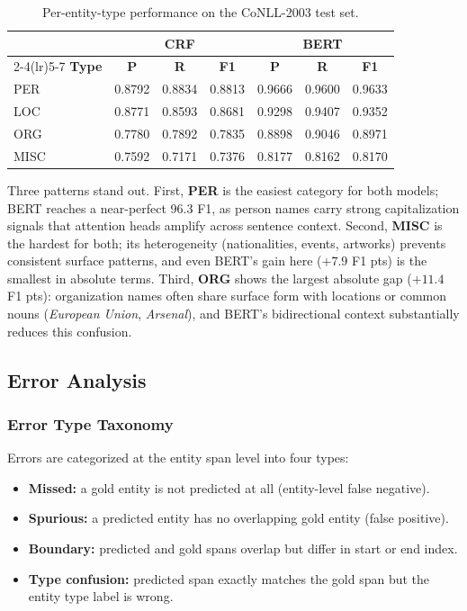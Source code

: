 \documentclass[11pt,a4paper]{article}
\begin{document}
\begin{table}[H]
\centering
\caption{Per-entity-type performance on the CoNLL-2003 test set.}
\label{tab:q2-per-entity}
\begin{tabular}{lcccccc}
\toprule
& \multicolumn{3}{c}{\textbf{CRF}} & \multicolumn{3}{c}{\textbf{BERT}} \\
\cmidrule(lr){2-4}\cmidrule(lr){5-7}
\textbf{Type} & \textbf{P} & \textbf{R} & \textbf{F1}
              & \textbf{P} & \textbf{R} & \textbf{F1} \\
\midrule
PER  & 0.8792 & 0.8834 & 0.8813 & 0.9666 & 0.9600 & 0.9633 \\
LOC  & 0.8771 & 0.8593 & 0.8681 & 0.9298 & 0.9407 & 0.9352 \\
ORG  & 0.7780 & 0.7892 & 0.7835 & 0.8898 & 0.9046 & 0.8971 \\
MISC & 0.7592 & 0.7171 & 0.7376 & 0.8177 & 0.8162 & 0.8170 \\
\bottomrule
\end{tabular}
\end{table}

Three patterns stand out. First, \textbf{PER} is the easiest category for both
models; BERT reaches a near-perfect 96.3 F1, as person names carry strong
capitalization signals that attention heads amplify across sentence context.
Second, \textbf{MISC} is the hardest for both; its heterogeneity (nationalities,
events, artworks) prevents consistent surface patterns, and even BERT's gain
here ($+7.9$ F1 pts) is the smallest in absolute terms. Third, \textbf{ORG}
shows the largest absolute gap ($+11.4$ F1 pts): organization names often share
surface form with locations or common nouns (\emph{European Union}, \emph{Arsenal}),
and BERT's bidirectional context substantially reduces this confusion.

\subsection{Error Analysis}

\subsubsection{Error Type Taxonomy}

Errors are categorized at the entity span level into four types:
\begin{itemize}[noitemsep]
    \item \textbf{Missed:} a gold entity is not predicted at all (entity-level
    false negative).
    \item \textbf{Spurious:} a predicted entity has no overlapping gold entity
    (false positive).
    \item \textbf{Boundary:} predicted and gold spans overlap but differ in
    start or end index.
    \item \textbf{Type confusion:} predicted span exactly matches the gold span
    but the entity type label is wrong.
\end{itemize}
\end{document}
